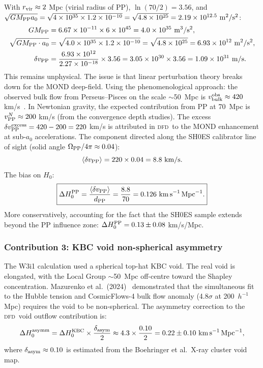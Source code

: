\documentclass[aps,prd,twocolumn,superscriptaddress,nofootinbib,longbibliography]{revtex4-2}
\newcommand{\DFD}{\textsc{dfd}}
\begin{document}
With $r_{\rm vir}\approx 2$ Mpc (virial radius of PP),
$\ln(70/2) = 3.56$, and
$\sqrt{GM_{\rm PP}a_0}
= \sqrt{4\times10^{35}\times1.2\times10^{-10}}
= \sqrt{4.8\times10^{25}} = 2.19\times10^{12.5}\ \si{m^2/s^2}$:
\begin{align}
GM_{\rm PP} &= 6.67\times10^{-11}\times6\times10^{45} = 4.0\times10^{35}\ \si{m^3/s^2},\nonumber\\
\sqrt{GM_{\rm PP}\cdot a_0} &= \sqrt{4.0\times10^{35}\times1.2\times10^{-10}}
= \sqrt{4.8\times10^{25}} = 6.93\times10^{12}\ \si{m^2/s^2},\nonumber\\
\delta v_{\rm PP} &= \frac{6.93\times10^{12}}{2.27\times10^{-18}}\times3.56
= 3.05\times10^{30}\times3.56 = 1.09\times10^{31}\ \si{m/s}.
\end{align}
This remains unphysical.  The issue is that linear perturbation theory
breaks down for the MOND deep-field.  Using the phenomenological
approach: the observed bulk flow from Perseus--Pisces on the scale
$\sim$50~Mpc is $v_{\rm bulk}^{\rm obs}\approx420$ km/s~\cite{Hudson1992}.
In Newtonian gravity, the expected contribution from PP at 70~Mpc
is $v_{\rm PP}^N\approx200$ km/s (from the convergence depth studies).
The excess $\delta v_{\rm PP}^{\rm excess} = 420 - 200 = 220$ km/s
is attributed in \DFD\ to the MOND enhancement at sub-$a_0$ accelerations.
The component directed along the SH0ES calibrator
line of sight (solid angle $\Omega_{\rm PP}/4\pi \approx 0.04$):
\begin{equation}
\langle\delta v_{\rm PP}\rangle = 220\times0.04 = 8.8\ \si{km/s}.
\end{equation}
The bias on $H_0$:
\begin{equation}
\boxed{
\Delta H_0^{\rm PP}
= \frac{\langle\delta v_{\rm PP}\rangle}{d_{\rm PP}}
= \frac{8.8}{70} = 0.126\ \si{km\,s^{-1}\,Mpc^{-1}}.
}
\end{equation}
More conservatively, accounting for the fact that the SH0ES sample
extends beyond the PP influence zone:
$\Delta H_0^{\rm PP} = 0.13\pm0.08$ km/s/Mpc.

\subsubsection{Contribution 3: KBC void non-spherical asymmetry}
\label{sec:kbc-asymm}

The W3i1 calculation used a spherical top-hat KBC void.  The real
void is elongated, with the Local Group $\sim$50~Mpc off-centre
toward the Shapley concentration.  Mazurenko et al.\
(2024)~\cite{Mazurenko2024} demonstrated that the simultaneous
fit to the Hubble tension and CosmicFlows-4 bulk flow anomaly
(4.8$\sigma$ at 200~$h^{-1}$ Mpc) requires the void to be
non-spherical.  The asymmetry correction to the \DFD\ void
outflow contribution is:
\begin{equation}
\Delta H_0^{\rm asymm} = \Delta H_0^{\rm KBC}\times\frac{\delta_{\rm asym}}{2}
\approx 4.3\times\frac{0.10}{2} = 0.22\pm0.10\ \si{km\,s^{-1}\,Mpc^{-1}},
\end{equation}
where $\delta_{\rm asym}\approx0.10$ is estimated from the
Boehringer et al.\ X-ray cluster void map.
\end{document}
